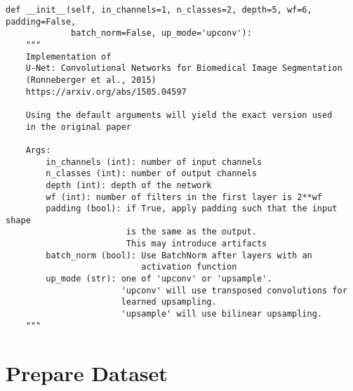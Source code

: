 \documentclass[11pt]{article}
\begin{document}
    \begin{verbatim}
def __init__(self, in_channels=1, n_classes=2, depth=5, wf=6, padding=False,
             batch_norm=False, up_mode='upconv'):
    """
    Implementation of
    U-Net: Convolutional Networks for Biomedical Image Segmentation
    (Ronneberger et al., 2015)
    https://arxiv.org/abs/1505.04597

    Using the default arguments will yield the exact version used
    in the original paper

    Args:
        in_channels (int): number of input channels
        n_classes (int): number of output channels
        depth (int): depth of the network
        wf (int): number of filters in the first layer is 2**wf
        padding (bool): if True, apply padding such that the input shape
                        is the same as the output.
                        This may introduce artifacts
        batch_norm (bool): Use BatchNorm after layers with an
                           activation function
        up_mode (str): one of 'upconv' or 'upsample'.
                       'upconv' will use transposed convolutions for
                       learned upsampling.
                       'upsample' will use bilinear upsampling.
    """
\end{verbatim}

    \section{Prepare Dataset}\label{prepare-dataset}
\end{document}
